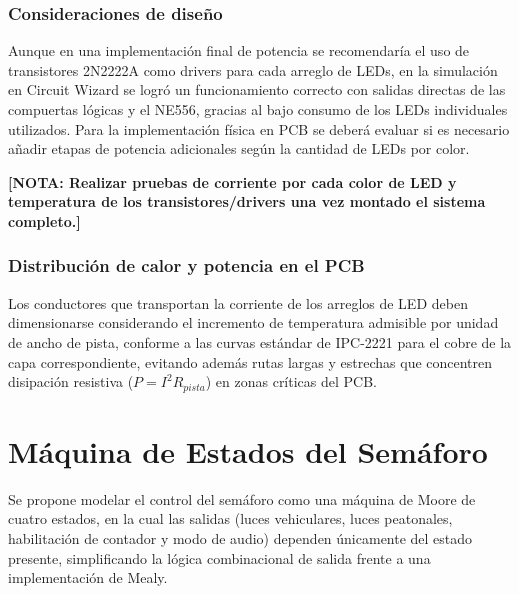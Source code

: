 \documentclass[10pt,onecolumn]{IEEEtran}
\newcommand{\NOTA}[1]{\textbf{[NOTA: #1]}}
\begin{document}
\subsubsection{Consideraciones de diseño}

Aunque en una implementación final de potencia se recomendaría el uso de transistores 2N2222A como drivers para cada arreglo de LEDs, en la simulación en Circuit Wizard se logró un funcionamiento correcto con salidas directas de las compuertas lógicas y el NE556, gracias al bajo consumo de los LEDs individuales utilizados. Para la implementación física en PCB se deberá evaluar si es necesario añadir etapas de potencia adicionales según la cantidad de LEDs por color.

\NOTA{Realizar pruebas de corriente por cada color de LED y temperatura de los transistores/drivers una vez montado el sistema completo.}
\\
\subsubsection{Distribución de calor y potencia en el PCB}
Los conductores que transportan la corriente de los arreglos de LED deben dimensionarse considerando el incremento de temperatura admisible por unidad de ancho de pista, conforme a las curvas estándar de IPC-2221 para el cobre de la capa correspondiente, evitando además rutas largas y estrechas que concentren disipación resistiva ($P = I^2 R_{pista}$) en zonas críticas del PCB.
\\


\section{Máquina de Estados del Semáforo}
\label{sec:estados}

Se propone modelar el control del semáforo como una máquina de Moore de cuatro estados, en la cual las salidas (luces vehiculares, luces peatonales, habilitación de contador y modo de audio) dependen únicamente del estado presente, simplificando la lógica combinacional de salida frente a una implementación de Mealy.
\\
\end{document}
